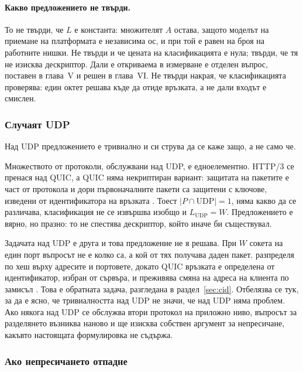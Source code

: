 

\paragraph{Какво предложението не твърди.} То не твърди, че \(L\) е константа: множителят
\(A\) остава, защото моделът на приемане на платформата е независима ос, и при
 той е равен на броя на работните нишки. Не твърди
и че цената на класификацията е нула; твърди, че тя не изисква дескриптор. Дали е откриваема
в измерване е отделен въпрос, поставен в глава~V и решен в глава~VI. Не твърди накрая, че
класификацията проверява: един октет решава къде да отиде връзката, а не дали входът е
смислен.

\subsubsection{Случаят UDP}

Над UDP предложението е тривиално и си струва да се каже защо, а не само че.

Множеството от протоколи, обслужвани над UDP, е едноелементно. HTTP/3 се пренася над QUIC, а
QUIC няма некриптиран вариант: защитата на пакетите е част от протокола и дори първоначалните
пакети са защитени с ключове, изведени от идентификатора на връзката \cite{rfc9001}. Тоест
\(|P \cap \mathrm{UDP}| = 1\), няма какво да се различава, класификация не се извършва изобщо
и \(L_{\mathrm{UDP}} = W\). Предложението е вярно, но празно: то не спестява дескриптор,
който иначе би съществувал.

Задачата над UDP е друга и това предложение не я решава. При \(W\) сокета на един порт
въпросът не е колко са, а кой от тях получава даден пакет.  разпределя по
хеш върху адресите и портовете, докато QUIC връзката е определена от идентификатор, избран от
сървъра, и преживява смяна на адреса на клиента по замисъл \cite{rfc9000}. Това е обратната
задача, разгледана в раздел~\ref{sec:cid}. Отбелязва се тук, за да е ясно, че тривиалността
над UDP не значи, че над UDP няма проблем. Ако някога над UDP се обслужва втори протокол на
приложно ниво, въпросът за разделянето възниква наново и ще изисква собствен аргумент за
непресичане, какъвто настоящата формулировка не съдържа.

\subsubsection{Ако непресичането отпадне}


